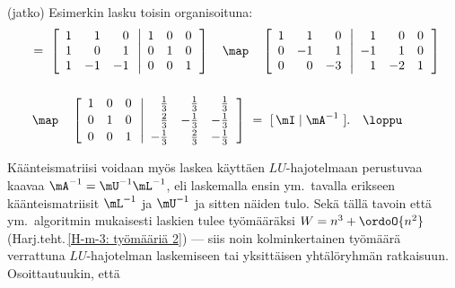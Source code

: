 \jatko \begin{Exa} (jatko) Esimerkin lasku toisin organisoituna:
\begin{align*}
[\,\mA \mid \mI\ ]\ 
    &=\  \left[ \begin{array}{rrr} 1&1&0 \\ 1&0&1 \\ 1&-1&-1 \end{array} \left\vert 
                 \begin{array}{rrr} 1&0&0 \\ 0&1&0 \\ 0&0&1 \end{array} \right. \right] \quad 
     \map \quad 
         \left[ \begin{array}{rrr} 1&1&0 \\ 0&-1&1 \\ 0&0&-3 \end{array} \left\vert
                \begin{array}{rrr} 1&0&0 \\ -1&1&0 \\ 1&-2&1 \end{array} \right. \right] \\[5mm]
    &\,\map \quad 
         \left[ \begin{array}{rrr} 1&0&0 \\[0.5mm] 0&1&0 \\[0.5mm] 0&0&1 \end{array} \left\vert
                \begin{array}{rrr} \frac{1}{3} & \frac{1}{3} & \frac{1}{3} \\[0.5mm] 
                                   \frac{2}{3} & -\frac{1}{3} & -\frac{1}{3} \\[0.5mm]
                                  -\frac{1}{3} & \frac{2}{3} & -\frac{1}{3} \end{array} \right.
         \right]\ =\ [\,\mI \mid \mA^{-1}\ ]. \quad \loppu
\end{align*}
\end{Exa}
Käänteismatriisi voidaan myös laskea käyttäen $LU$-hajotelmaan perustuvaa kaavaa
$\mA^{-1}=\mU^{-1}\mL^{-1}$, eli laskemalla ensin ym.\ tavalla erikseen käänteismatriisit 
$\mL^{-1}$ ja $\mU^{-1}$ ja sitten näiden tulo. Sekä tällä tavoin että ym.\ algoritmin 
mukaisesti laskien tulee työmääräksi $W=n^3+\ordoO{n^2}$ 
(Harj.teht.\,\ref{H-m-3: työmääriä 2}) --- siis noin kolminkertainen työmäärä verrattuna
$LU$-hajotelman laskemiseen tai yksittäisen yhtälöryhmän ratkaisuun. Osoittautuukin, että 
